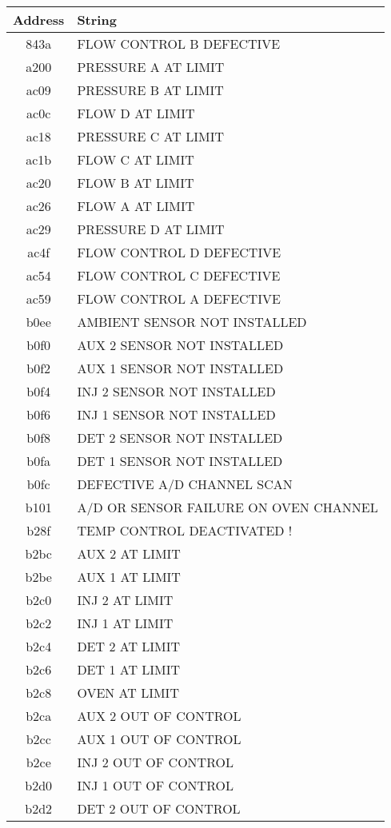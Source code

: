\documentclass[hidelinks,11pt]{article}
\newcommand{\tn}[1]{\textnormal{#1}}
\newcommand{\gap}{\bigskip\noindent}
\begin{document}
\gap
\begin{tabular}{|C|l|}
  \hline
  \tn{Address} & String \\
  \hline
  843a & FLOW CONTROL B DEFECTIVE \\
  a200 & PRESSURE A AT LIMIT \\
  ac09 & PRESSURE B AT LIMIT \\
  ac0c & FLOW D AT LIMIT \\
  ac18 & PRESSURE C AT LIMIT \\
  ac1b & FLOW C AT LIMIT \\
  ac20 & FLOW B AT LIMIT \\
  ac26 & FLOW A AT LIMIT \\
  ac29 & PRESSURE D AT LIMIT \\
  ac4f & FLOW CONTROL D DEFECTIVE \\
  ac54 & FLOW CONTROL C DEFECTIVE \\
  ac59 & FLOW CONTROL A DEFECTIVE \\
  b0ee & AMBIENT SENSOR NOT INSTALLED \\
  b0f0 & AUX 2 SENSOR NOT INSTALLED \\
  b0f2 & AUX 1 SENSOR NOT INSTALLED \\
  b0f4 & INJ 2 SENSOR NOT INSTALLED \\
  b0f6 & INJ 1 SENSOR NOT INSTALLED \\
  b0f8 & DET 2 SENSOR NOT INSTALLED \\
  b0fa & DET 1 SENSOR NOT INSTALLED \\
  b0fc & DEFECTIVE A/D CHANNEL SCAN \\
  b101 & A/D OR SENSOR FAILURE ON OVEN CHANNEL \\
  b28f & TEMP CONTROL DEACTIVATED ! \\
  b2bc & AUX 2 AT LIMIT \\
  b2be & AUX 1 AT LIMIT \\
  b2c0 & INJ 2 AT LIMIT \\
  b2c2 & INJ 1 AT LIMIT \\
  b2c4 & DET 2 AT LIMIT \\
  b2c6 & DET 1 AT LIMIT \\
  b2c8 & OVEN AT LIMIT \\
  b2ca & AUX 2 OUT OF CONTROL \\
  b2cc & AUX 1 OUT OF CONTROL \\
  b2ce & INJ 2 OUT OF CONTROL \\
  b2d0 & INJ 1 OUT OF CONTROL \\
  b2d2 & DET 2 OUT OF CONTROL \\

\end{tabular}
\end{document}
